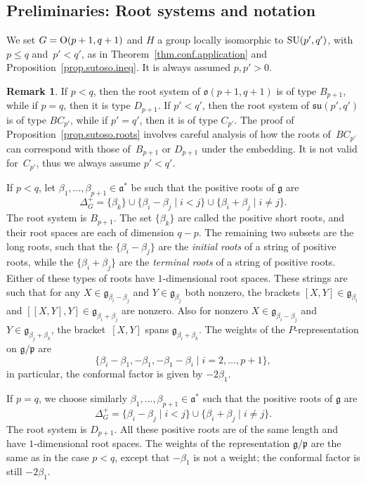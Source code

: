 \documentclass[pdftex]{sigma}
\numberwithin{equation}{section}
\theoremstyle{definition}
\newtheorem{rem}[thm]{Remark}
\newcommand{\lieg}{\mathfrak{g}}
\def\g{{\mathfrak g}}
\def\p{{\mathfrak p}}
\def\a{{\mathfrak a}}
\def\lieo{{\mathfrak o}}
\begin{document}
\subsection{Preliminaries: Root systems and notation}

We set $G = {\rm O}(p+1,q+1)$ and $H$ a group locally isomorphic to ${\rm SU}(p',q')$, with $p\leq q$ and~${p' < q'}$, as in Theorem~\ref{thm.conf.application} and Proposition~\ref{prop.sutoso.ineq}. It is always assumed $p, p' > 0$.

\begin{rem}
If $p<q$, then the root system of $\lieo(p+1,q+1)$ is of type $B_{p+1}$, while if $p=q$, then it is type $D_{p+1}$. If $p'<q'$, then the root system of $\mathfrak{su}(p',q')$ is of type $BC_{p'}$, while if $p'=q'$, then it is of type $C_{p'}$. The proof of Proposition~\ref{prop.sutoso.roots} involves careful analysis of how the roots of~$BC_{p'}$ can correspond with those of~$B_{p+1}$ or $D_{p+1}$ under the embedding. It is not valid for~$C_{p'}$, thus we always assume $p' < q'$.
\end{rem}


If $p<q$, let $\beta_1, \dots, \beta_{p+1} \in \a^*$ be such that the positive roots of $\lieg$ are
\[ \Delta^+_G = \{ \beta_k \} \cup \{ \beta_i - \beta_j \mid i < j \} \cup \{ \beta_i + \beta_j \mid i \neq j\}.\]
The root system is $B_{p+1}$.
The set $\{ \beta_k \}$ are called the positive short roots, and their root spaces are each of dimension $q-p$. The remaining two subsets are the long roots, such that the $\{ \beta_i - \beta_j \}$ are the \emph{initial roots} of a string of positive roots, while the $\{ \beta_i + \beta_j \}$ are the \emph{terminal roots} of a string of positive roots. Either of these types of roots have $1$-dimensional root spaces. These strings are such that for any $X \in \g_{\beta_i - \beta_j}$ and $Y \in \g_{\beta_j}$ both nonzero, the brackets $[X,Y] \in \g_{\beta_i}$ and $[[X,Y],Y] \in \g_{\beta_i + \beta_j}$ are nonzero. Also for nonzero $X \in \g_{\beta_i - \beta_j}$ and~$Y \in \g_{\beta_j + \beta_k}$, the bracket~$[X,Y]$ spans $\g_{\beta_i + \beta_k}$.
 The weights of the $P$-representation on $\lieg/ \p$ are
\[\{ \beta_i - \beta_1, - \beta_1, - \beta_1 - \beta_i \mid i =2, \dots, p+1 \},\]
in particular, the conformal factor is given by $- 2 \beta_1$.

If $p=q$, we choose similarly $\beta_1, \dots, \beta_{p+1} \in \a^*$ such that the positive roots of $\lieg$ are
\[ \Delta^+_G = \{ \beta_i - \beta_j \mid i < j \} \cup \{ \beta_i + \beta_j \mid i \neq j\}.\]
The root system is $D_{p+1}$. All these positive roots are of the same length and have $1$-dimensional root spaces. The weights of the representation $\lieg/ \p$ are the same as in the case $p<q$, except that $-\beta_1$ is not a weight; the conformal factor is still $- 2 \beta_1$.
\end{document}

